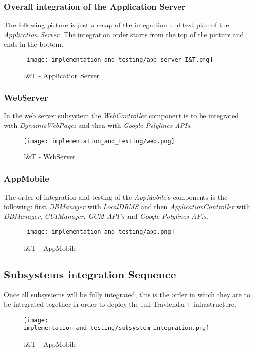 \subsubsection{Overall integration of the Application Server}
The following picture is just a recap of the integration and test plan of the \textit{Application Server}. The integration order starts from the top of the picture and ends in the bottom.
\begin{figure}[H]
	\begin{center}
		\hspace*{-20 pt}
		\texttt{[image: implementation\_and\_testing/app\_server\_I\&T.png]}
	\end{center}
	\caption{I\&T - Application Server}
\end{figure}
\newpage
\subsubsection{WebServer}
In the web server subsystem the \textit{WebController} component is to be integrated with \textit{DynamicWebPages} and then with \textit{Google Polylines APIs}. 
\begin{figure}[H]
	\begin{center}
		\texttt{[image: implementation\_and\_testing/web.png]}
	\end{center}
	\caption{I\&T - WebServer}
\end{figure}

\subsubsection{AppMobile}
The order of integration and testing of the \textit{AppMobile}'s components is the following: first \textit{DBManager} with \textit{LocalDBMS} and then \textit{ApplicationController} with \textit{DBManager}, \textit{GUIManager}, \textit{GCM API's} and \textit{Google Polylines APIs}. 
\begin{figure}[H]
	\begin{center}
		\texttt{[image: implementation\_and\_testing/app.png]}
	\end{center}
	\caption{I\&T - AppMobile}
\end{figure}
\newpage
\subsection{Subsystems integration Sequence}
Once all subsystems will be fully integrated, this is the order in which they are to be integrated together in order to deploy the full Travlendar+ infrastructure.
\begin{figure}[H]
	\begin{center}
		\texttt{[image: implementation\_and\_testing/subsystem\_integration.png]}
	\end{center}
	\caption{I\&T - AppMobile}
\end{figure}